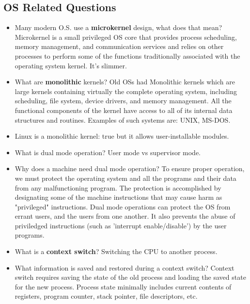 \documentclass[fontsize=5pt]{scrartcl}
\begin{document}
\begin{multicols}{3}
\begin{itemize}
                
          
        \end{itemize}
    
    \subsection{OS Related Questions}
      \begin{itemize}
          \item Many modern O.S. use a \textbf{microkernel} design, what does that mean? Microkernel is a small privileged OS core that provides process
                scheduling, memory management, and communication services and relies on other processes to perform some of the functions 
                traditionally associated with the operating system kernel. It's slimmer.
          \item What are \textbf{monolithic} kernels? Old OSs had Monolithic kernels which are large kernels containing
                virtually the complete operating system, including scheduling, file 
                system, device drivers, and memory management.  All the functional
                components of the kernel have access to all of its internal data
                structures and routines. Examples of such systems are: UNIX, MS-DOS.
          \item Linux is a monolithic kernel: true but it allows user-installable modules.
          \item What is dual mode operation? User mode vs supervisor mode.
          \item Why does a machine need dual mode operation? To ensure proper operation, we must protect the operating system and all 
                the programs and their data from any malfunctioning program. 
                The protection is accomplished by designating some of the machine
                instructions that may cause harm as "privileged" instructions.
                Dual mode operations can protect the OS from errant users, and the users from one another. 
                It also prevents the abuse of priviledged instructions (such as 'interrupt enable/disable')
                by the user programs.
          \item What is a \textbf{context switch}? Switching the CPU to another process.
          \item What information is saved and restored during a context switch? Context switch requires saving the state of the old process and
                loading the saved state for the new process. Process state
                minimally includes current contents of registers, program counter,
                stack pointer, file descriptors, etc. 


\end{itemize}
\end{multicols}
\end{document}
